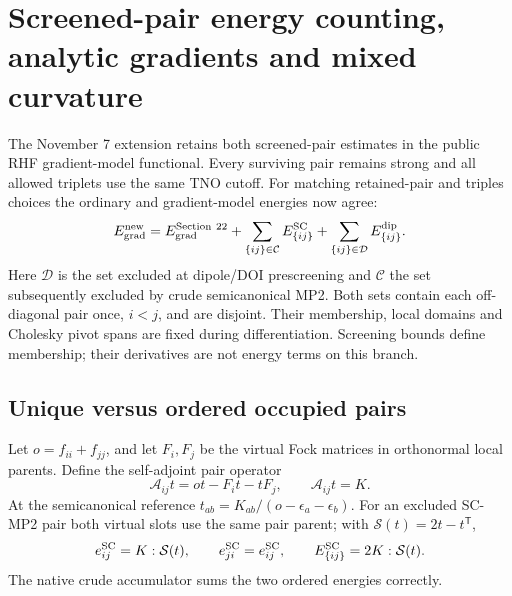 \documentclass[11pt]{article}
\begin{document}
\section{Screened-pair energy counting, analytic gradients and mixed curvature}
The November 7 extension retains both screened-pair estimates in the public
RHF gradient-model functional. Every surviving pair remains strong and all
allowed triplets use the same TNO cutoff. For matching retained-pair and
triples choices the ordinary and gradient-model energies now agree:
\begin{equation}
 E_{\rm grad}^{\rm new}=E_{\rm grad}^{\rm Section\ 22}
       +\sum_{\{ij\}\in\mathcal C}E_{\{ij\}}^{\rm SC}
       +\sum_{\{ij\}\in\mathcal D}E_{\{ij\}}^{\rm dip}.
 \label{eq:screened-energy}
\end{equation}
Here $\mathcal D$ is the set excluded at dipole/DOI prescreening and
$\mathcal C$ the set subsequently excluded by crude semicanonical MP2.
Both sets contain each off-diagonal pair once, $i<j$, and are disjoint.
Their membership, local domains and Cholesky pivot spans are fixed during
differentiation. Screening bounds define membership; their derivatives
are not energy terms on this branch.

\subsection{Unique versus ordered occupied pairs}
Let $o=f_{ii}+f_{jj}$, and let $F_i,F_j$ be the virtual Fock matrices in
orthonormal local parents. Define the self-adjoint pair operator
\begin{equation}
 \mathcal A_{ij}t=o t-F_i t-tF_j,\qquad \mathcal A_{ij}t=K.
 \label{eq:screened-sylvester}
\end{equation}
At the semicanonical reference $t_{ab}=K_{ab}/(o-\epsilon_a-\epsilon_b)$.
For an excluded SC-MP2 pair both virtual slots use the same pair parent;
with $\mathcal S(t)=2t-t^{\mathsf T}$,
\begin{equation}
 e_{ij}^{\rm SC}=K:\mathcal S(t),\qquad
 e_{ji}^{\rm SC}=e_{ij}^{\rm SC},\qquad
 E_{\{ij\}}^{\rm SC}=2K:\mathcal S(t).
\end{equation}
The native crude accumulator sums the two ordered energies correctly.
\end{document}
